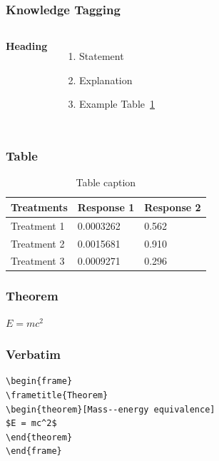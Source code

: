 \documentclass{beamer}
\begin{document}
\begin{frame}
  \frametitle{Knowledge Tagging}
  \begin{columns}[c] %

    \textbf{Heading}
    \begin{enumerate}
      \item Statement
      \item Explanation
      \item Example Table~\ref{tbl:t1}
    \end{enumerate}



  \end{columns}
\end{frame}

\begin{frame}
  \frametitle{Table}
  \begin{table}
    \caption{Table caption}\label{tbl:t1}
    \begin{tabular}{l l l}
      \toprule
      \textbf{Treatments} & \textbf{Response 1} & \textbf{Response 2} \\
      \midrule
      Treatment 1         & 0.0003262           & 0.562               \\
      Treatment 2         & 0.0015681           & 0.910               \\
      Treatment 3         & 0.0009271           & 0.296               \\
      \bottomrule
    \end{tabular}
  \end{table}
\end{frame}


\begin{frame}
  \frametitle{Theorem}
  \begin{theorem}
    \(E = mc^2\)
  \end{theorem}
\end{frame}


\begin{frame}[fragile] %
  \frametitle{Verbatim}
  \begin{example}
    \begin{verbatim}
\begin{frame}
\frametitle{Theorem}
\begin{theorem}[Mass--energy equivalence]
$E = mc^2$
\end{theorem}
\end{frame}\end{verbatim}
  \end{example}
\end{frame}
\end{document}
